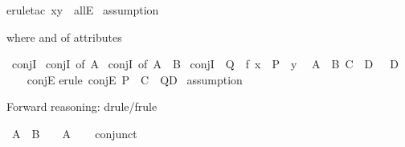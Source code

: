 \begin{isabellebody}
{\isacharparenleft}{\kern0pt}erule{\isacharunderscore}{\kern0pt}tac\ x{\isacharequal}{\kern0pt}y\ \ allE{\isacharparenright}{\kern0pt}\isanewline
{}\isamarkupfalse%
\ assumption\isanewline
\ \ \isamarkupfalse%
%
\endisatagproof
{\isafoldproof}%
%
\isadelimproof
%
\endisadelimproof
%
\begin{isamarkuptext}%
where and of attributes%
\end{isamarkuptext}\isamarkuptrue%
\isamarkupfalse%
\ conjI\isanewline
{}\isamarkupfalse%
\ conjI\ {\isacharbrackleft}{\kern0pt}of\ {\isachardoublequoteopen}A{\isachardoublequoteclose}{\isacharbrackright}{\kern0pt}\isanewline
{}\isamarkupfalse%
\ conjI\ {\isacharbrackleft}{\kern0pt}of\ {\isachardoublequoteopen}A{\isachardoublequoteclose}\ \ {\isachardoublequoteopen}B{\isachardoublequoteclose}{\isacharbrackright}{\kern0pt}\isanewline
{}\isamarkupfalse%
\ conjI\ {\isacharbrackleft}{\kern0pt}\ Q\ {\isacharequal}{\kern0pt}\ {\isachardoublequoteopen}f\ x{\isachardoublequoteclose}\ \ P\ {\isacharequal}{\kern0pt}\ {\isachardoublequoteopen}y{\isachardoublequoteclose}{\isacharbrackright}{\kern0pt}\isanewline
\isanewline
{}\isamarkupfalse%
\ {\isachardoublequoteopen}{\isasymlbrakk}\ A\ {\isasymand}\ B{\isacharsemicolon}{\kern0pt}\ C\ {\isasymand}\ D\ {\isasymrbrakk}\ {\isasymLongrightarrow}\ D{\isachardoublequoteclose}\isanewline
\ \ \isamarkupfalse%
\ conjE\isanewline
%
\isadelimproof
%
\endisadelimproof
%
\isatagproof
{}\isamarkupfalse%
{\isacharparenleft}{\kern0pt}erule\ conjE{\isacharbrackleft}{\kern0pt}\ P\ {\isacharequal}{\kern0pt}\ {\isachardoublequoteopen}C{\isachardoublequoteclose}\ \ Q{\isacharequal}{\kern0pt}{\isachardoublequoteopen}D{\isachardoublequoteclose}{\isacharbrackright}{\kern0pt}{\isacharparenright}{\kern0pt}\isanewline
\isanewline
{}\isamarkupfalse%
\ assumption\isanewline
{}\isamarkupfalse%
%
\endisatagproof
{\isafoldproof}%
%
\isadelimproof
%
\endisadelimproof
%
\begin{isamarkuptext}%
Forward reasoning: drule/frule%
\end{isamarkuptext}\isamarkuptrue%
\isamarkupfalse%
\ {\isachardoublequoteopen}A\ {\isasymand}\ B\ {\isasymLongrightarrow}\ {\isasymnot}\ {\isasymnot}\ A{\isachardoublequoteclose}\isanewline
\ \ \isamarkupfalse%
\ conjunct{}\isanewline
\ \ \isamarkupfalse%

\end{isabellebody}
